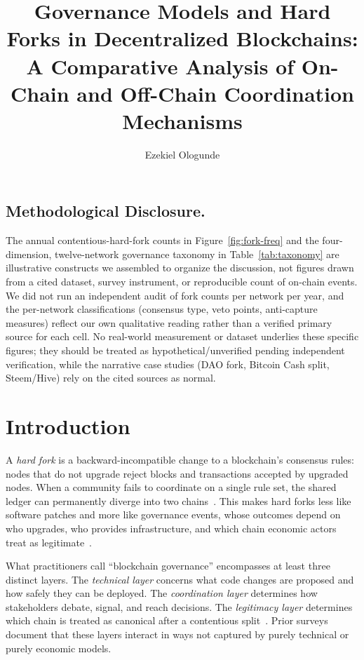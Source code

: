 \documentclass[sigconf,nonacm]{acmart}
\title{Governance Models and Hard Forks in Decentralized Blockchains:\\
A Comparative Analysis of On-Chain and Off-Chain Coordination Mechanisms}
\author{Ezekiel Ologunde}
\affiliation{\institution{Independent Researcher}\city{Boston}\state{MA}\country{USA}}
\begin{document}
\sloppy
\maketitle

\subsection*{Methodological Disclosure.}
The annual contentious-hard-fork counts in Figure~\ref{fig:fork-freq} and the four-dimension,
twelve-network governance taxonomy in Table~\ref{tab:taxonomy} are illustrative constructs we
assembled to organize the discussion, not figures drawn from a cited dataset, survey instrument,
or reproducible count of on-chain events. We did not run an independent audit of fork counts
per network per year, and the per-network classifications (consensus type, veto points,
anti-capture measures) reflect our own qualitative reading rather than a verified primary
source for each cell. No real-world measurement or dataset underlies these specific figures;
they should be treated as hypothetical/unverified pending independent verification, while the
narrative case studies (DAO fork, Bitcoin Cash split, Steem/Hive) rely on the cited sources as
normal.

\section{Introduction}

A \emph{hard fork} is a backward-incompatible change to a blockchain's consensus rules:
nodes that do not upgrade reject blocks and transactions accepted by upgraded nodes. When
a community fails to coordinate on a single rule set, the shared ledger can permanently
diverge into two chains~\cite{nakamoto2008bitcoin,atzei2017survey}. This makes hard forks
less like software patches and more like governance events, whose outcomes depend on who
upgrades, who provides infrastructure, and which chain economic actors treat as
legitimate~\cite{walch2019code,de2021blockchain}.

What practitioners call ``blockchain governance'' encompasses at least three distinct
layers. The \emph{technical layer} concerns what code changes are proposed and how safely
they can be deployed. The \emph{coordination layer} determines how stakeholders debate,
signal, and reach decisions. The \emph{legitimacy layer} determines which chain is treated
as canonical after a contentious split~\cite{reijers2021governance,beck2018governance}.
Prior surveys~\cite{tan2020blockchain,lumineau2021blockchain} document that these layers
interact in ways not captured by purely technical or purely economic models.
\end{document}
